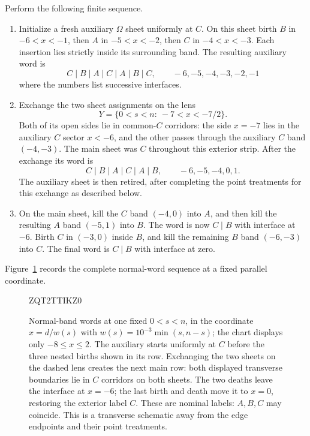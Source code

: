 \documentclass[11pt]{article}
\numberwithin{equation}{section}
\theoremstyle{definition}
\theoremstyle{remark}
\begin{document}
Perform the following finite sequence.
\begin{enumerate}
\item
Initialize a fresh auxiliary $\Omega$ sheet uniformly at $C$.  On this
sheet birth $B$ in $-6<x<-1$, then $A$ in $-5<x<-2$, then $C$ in
$-4<x<-3$.  Each insertion lies strictly inside its surrounding band.
The resulting auxiliary word is
\begin{equation}
 C\mid B\mid A\mid C\mid A\mid B\mid C,
 \qquad -6,-5,-4,-3,-2,-1
 \label{eq:geometry-aux-word}
\end{equation}
where the numbers list successive interfaces.
\item
Exchange the two sheet assignments on the lens
\begin{equation}
 Y=\{0<s<n:\ -7<x<-7/2\}.
 \label{eq:geometry-lens}
\end{equation}
Both of its open sides lie in common-$C$ corridors: the side $x=-7$
lies in the auxiliary $C$ sector $x<-6$, and the other passes
through the auxiliary $C$ band $(-4,-3)$.  The main sheet was $C$
throughout this exterior strip.  After the exchange its word is
\begin{equation}
 C\mid B\mid A\mid C\mid A\mid B,
 \qquad -6,-5,-4,0,1.
 \label{eq:geometry-main-word}
\end{equation}
The auxiliary sheet is then retired, after completing the point
treatments for this exchange as described below.
\item
On the main sheet, kill the $C$ band $(-4,0)$ into $A$, and then kill
the resulting $A$ band $(-5,1)$ into $B$.  The word is now $C\mid B$
with interface at $-6$.  Birth $C$ in $(-3,0)$ inside $B$, and kill
the remaining $B$ band $(-6,-3)$ into $C$.  The final word is
$C\mid B$ with interface at zero.
\end{enumerate}

Figure~\ref{fig:geometry-bands} records the complete normal-word
sequence at a fixed parallel coordinate.
\begin{figure}[tbp]

\begingroup
\newcommand{\geometrybandat}[5]{
  \path[band#4] (#2,{#1-.20}) rectangle (#3,{#1+.20});
  \node[font=\scriptsize] at ({#5},#1) {$#4$};
}
\newcommand{\geometryband}[4]{
  \geometrybandat{#1}{#2}{#3}{#4}{(#2+#3)/2}
}
\newcommand{\geometryrow}[2]{
  \node[anchor=east,align=right,font=\scriptsize]
    at (-8.20,#1) {#2};
}
ZQT2TTIKZ0
\endgroup
\caption{Normal-band words at one fixed $0<s<n$, in the coordinate
  $x=d/w(s)$ with $w(s)=10^{-3}\min(s,n-s)$; the chart displays only
  $-8\le x\le2$. The auxiliary starts uniformly at $C$ before the three
  nested births shown in its row. Exchanging the two sheets on the dashed
  lens creates the next main row: both displayed transverse boundaries
  lie in $C$ corridors on both sheets. The two deaths leave the interface
  at $x=-6$; the last
  birth and death move it to $x=0$, restoring the exterior label $C$.
  These are nominal labels: $A,B,C$ may coincide. This is a transverse
  schematic away from the edge endpoints and their point treatments.}
\label{fig:geometry-bands}
\end{figure}
\end{document}
